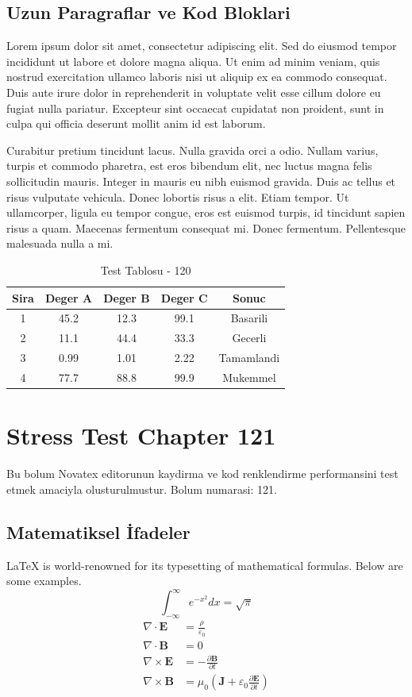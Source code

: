 \documentclass[12pt,a4paper]{article}
\begin{document}
\subsection{Uzun Paragraflar ve Kod Bloklari}
Lorem ipsum dolor sit amet, consectetur adipiscing elit. Sed do eiusmod tempor incididunt ut labore et dolore magna aliqua. Ut enim ad minim veniam, quis nostrud exercitation ullamco laboris nisi ut aliquip ex ea commodo consequat. Duis aute irure dolor in reprehenderit in voluptate velit esse cillum dolore eu fugiat nulla pariatur. Excepteur sint occaecat cupidatat non proident, sunt in culpa qui officia deserunt mollit anim id est laborum.

Curabitur pretium tincidunt lacus. Nulla gravida orci a odio. Nullam varius, turpis et commodo pharetra, est eros bibendum elit, nec luctus magna felis sollicitudin mauris. Integer in mauris eu nibh euismod gravida. Duis ac tellus et risus vulputate vehicula. Donec lobortis risus a elit. Etiam tempor. Ut ullamcorper, ligula eu tempor congue, eros est euismod turpis, id tincidunt sapien risus a quam. Maecenas fermentum consequat mi. Donec fermentum. Pellentesque malesuada nulla a mi.

\begin{table}[h!]
\centering
\begin{tabular}{|c|c|c|c|c|}
\hline
\textbf{Sira} & \textbf{Deger A} & \textbf{Deger B} & \textbf{Deger C} & \textbf{Sonuc} \\
\hline
1 & 45.2 & 12.3 & 99.1 & Basarili \\
2 & 11.1 & 44.4 & 33.3 & Gecerli \\
3 & 0.99 & 1.01 & 2.22 & Tamamlandi \\
4 & 77.7 & 88.8 & 99.9 & Mukemmel \\
\hline
\end{tabular}
\caption{Test Tablosu - 120}
\end{table}

\newpage
\section{Stress Test Chapter 121}
Bu bolum Novatex editorunun kaydirma ve kod renklendirme performansini test etmek amaciyla olusturulmustur. Bolum numarasi: 121.

\subsection{Matematiksel İfadeler}
\LaTeX{} is world-renowned for its typesetting of mathematical formulas. Below are some examples.
\begin{equation}
\int_{-\infty}^{\infty} e^{-x^2} dx = \sqrt{\pi}
\end{equation}
\begin{align}
\nabla \cdot \mathbf{E} &= \frac{\rho}{\varepsilon_0} \\
\nabla \cdot \mathbf{B} &= 0 \\
\nabla \times \mathbf{E} &= -\frac{\partial \mathbf{B}}{\partial t} \\
\nabla \times \mathbf{B} &= \mu_0\left(\mathbf{J} + \varepsilon_0 \frac{\partial \mathbf{E}}{\partial t}\right)
\end{align}
\end{document}
